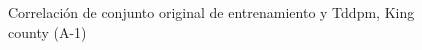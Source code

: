 \begin{figure}[H]
    \centering
    
    \caption{Correlación de conjunto original de entrenamiento y Tddpm, King county (A-1)}
    \label{pairwise-king county-a-1-tddpm_mlp}
\end{figure}